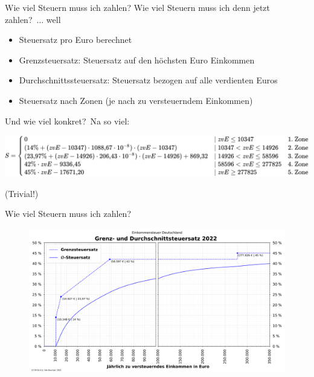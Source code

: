 \documentclass{beamer}
\begin{document}
			\begin{frame}{Wie viel Steuern muss ich zahlen?}
				Wie viel Steuern muss ich denn jetzt zahlen?\pause\ ... well\pause
				\begin{itemize}
					\item Steuersatz pro Euro berechnet\pause
					\item Grenzsteuersatz: Steuersatz auf den höchsten Euro Einkommen\pause
					\item Durchschnittssteuersatz: Steuersatz bezogen auf alle verdienten Euros\pause
					\item Steuersatz nach Zonen (je nach zu versteuerndem Einkommen)
				\end{itemize}
				\pause
				Und wie viel konkret?\pause\ Na so viel:\pause
				\begin{center}
					\includegraphics[width=\textwidth]{images/tarifzonen-formel}
				\end{center}
				\vspace*{-0.25cm}\pause
				{\tiny (Trivial!)}
				\vspace{0.55cm}
			\end{frame}
			
		
			\begin{frame}{Wie viel Steuern muss ich zahlen?}
				\begin{center}
					\vspace{-0.5cm}
					\begin{figure}
						\includegraphics[width=0.9\linewidth]{images/tarifzonen-diagramm}
					\end{figure}
				\end{center}
			\end{frame}
			
\end{document}
